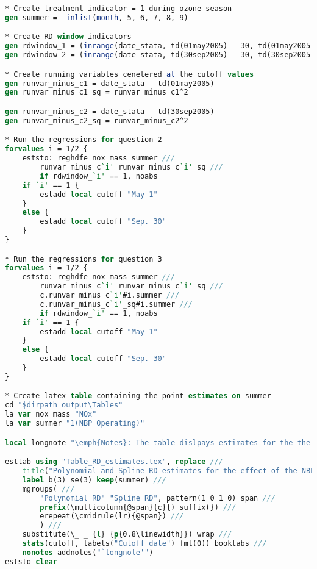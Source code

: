 \documentclass[12pt]{article}
\begin{document}
\begin{lstlisting}[language=Stata, numbers=none]
* Create treatment indicator = 1 during ozone season
gen summer =  inlist(month, 5, 6, 7, 8, 9)

* Create RD window indicators
gen rdwindow_1 = (inrange(date_stata, td(01may2005) - 30, td(01may2005) + 30))
gen rdwindow_2 = (inrange(date_stata, td(30sep2005) - 30, td(30sep2005) + 30))

* Create running variables cenetered at the cutoff values
gen runvar_minus_c1 = date_stata - td(01may2005)
gen runvar_minus_c1_sq = runvar_minus_c1^2

gen runvar_minus_c2 = date_stata - td(30sep2005)
gen runvar_minus_c2_sq = runvar_minus_c2^2

* Run the regressions for question 2
forvalues i = 1/2 {
	eststo: reghdfe nox_mass summer ///
		runvar_minus_c`i' runvar_minus_c`i'_sq ///
		if rdwindow_`i' == 1, noabs
	if `i' == 1 {
		estadd local cutoff "May 1"
	}
	else {
		estadd local cutoff "Sep. 30"
	}
}

* Run the regressions for question 3
forvalues i = 1/2 {
	eststo: reghdfe nox_mass summer ///
		runvar_minus_c`i' runvar_minus_c`i'_sq ///
		c.runvar_minus_c`i'#i.summer ///
		c.runvar_minus_c`i'_sq#i.summer ///
		if rdwindow_`i' == 1, noabs
	if `i' == 1 {
		estadd local cutoff "May 1"
	}
	else {
		estadd local cutoff "Sep. 30"
	}
}

* Create latex table containing the point estimates on summer
cd "$dirpath_output\Tables"
la var nox_mass "NOx"
la var summer "1(NBP Operating)"

local longnote "\emph{Notes}: The table dislpays estimates for the the effect of the NOx Budget Trading Program on average total daily NOx emissions. Columns 1--2 report the results using the polynomial regresion discontinuity, and Columns 3--4 report the results using the spline regression discontinuity. Columns 1 and 3 include the 30 days before and after May 1st in the sample, and Columns 2 and 4 include the 30 days before and after September 30th. Standard errors are in parentheses. * p<0.05, ** p<0.01, *** p<0.001"

esttab using "Table_RD_estimates.tex", replace ///
	title("Polynomial and Spline RD estimates for the effect of the NBP on NOx emissions \label{tab1}") ///
	label b(3) se(3) keep(summer) ///
	mgroups( ///
		"Polynomial RD" "Spline RD", pattern(1 0 1 0) span ///
		prefix(\multicolumn{@span}{c}{) suffix(}) ///
		erepeat(\cmidrule(lr){@span}) ///
		) ///
	substitute(\_ _ {l} {p{0.8\linewidth}}) wrap ///
	stats(cutoff, labels("Cutoff date") fmt(0)) booktabs ///
	nonotes addnotes("`longnote'")
eststo clear



\end{lstlisting}
\end{document}
